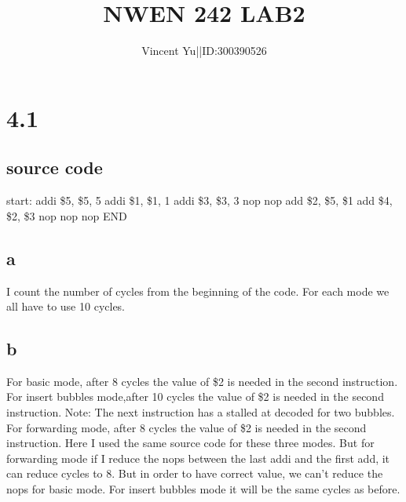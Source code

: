 \documentclass[]{article}
\title{NWEN 242 LAB2}
\author{Vincent Yu||ID:300390526}
\begin{document}
\maketitle

\section*{4.1}
\subsection*{source code}
start:\newline
addi \$5, \$5, 5\newline
addi \$1, \$1, 1\newline
addi \$3, \$3, 3 \newline
nop\newline
nop\newline
add \$2, \$5, \$1  \newline
add \$4, \$2, \$3 \newline
nop \newline 
nop \newline
nop \newline
END \newline 
\subsection*{a}

I count the number of cycles from the beginning of the code.
For each mode we all have to use 10 cycles. 
\subsection*{b}
For basic mode, after 8 cycles the value of \$2 is needed in the second instruction.\newline
For insert bubbles mode,after 10 cycles the value of \$2 is needed in the second instruction.\newline
Note: The next instruction has a stalled at decoded for two bubbles.\newline
For forwarding mode, after 8 cycles the value of \$2 is needed in the second instruction.\newline
Here I used the same source code for these three modes. But for forwarding mode if I reduce the nops between the last addi and the first add, it can reduce cycles to 8. But in order to have correct value, we can't reduce the nops for basic mode. For insert bubbles mode it will be the same cycles as before.\newline 
\end{document}
